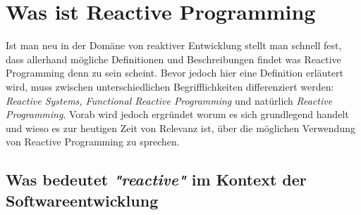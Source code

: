 \chapter{Was ist Reactive Programming}\label{was_ist_reactive_programming}
Ist man neu in der Domäne von reaktiver Entwicklung stellt man schnell fest, dass allerhand mögliche Definitionen und Beschreibungen findet was Reactive Programming denn zu sein scheint. Bevor jedoch hier eine Definition erläutert wird, muss zwischen unterschiedlichen Begrifflichkeiten differenziert werden: \textit{Reactive Systems, Functional Reactive Programming} und natürlich \textit{Reactive Programming}. Vorab wird jedoch ergründet worum es sich grundlegend handelt und wieso es zur heutigen Zeit von Relevanz ist, über die möglichen Verwendung von Reactive Programming zu sprechen.
\section{Was bedeutet \textit{"reactive"} im Kontext der Softwareentwicklung}
